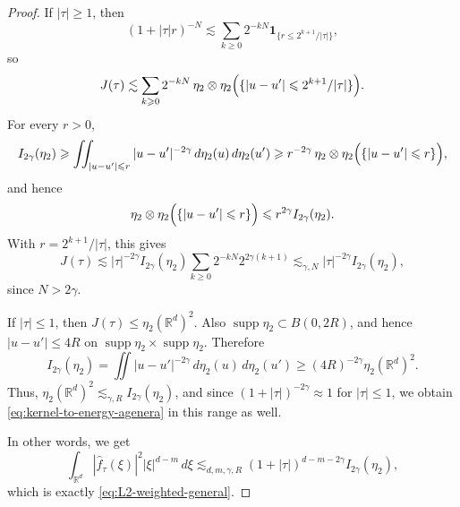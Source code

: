 \documentclass[10pt,a4paper]{amsart}
\newcommand{\Rd}{\mathbb{R}^d}
\newcommand{\spt}{\operatorname{supp}}
\renewcommand{\ge}{\geqslant}
\renewcommand{\le}{\leqslant}
\begin{document}
\begin{proof}
If $|\tau|\ge 1$, then
\[
(1+|\tau|r)^{-N}\lesssim \sum_{k\ge 0}2^{-kN}\mathbf 1_{\{r\le 2^{k+1}/|\tau|\}},
\]
so
\[
J(\tau)\lesssim
\sum_{k\ge 0}2^{-kN}\,
\eta_2\otimes\eta_2\Bigl(\{|u-u'|\le 2^{k+1}/|\tau|\}\Bigr).
\]
For every $r>0$,
\[
I_{2\gamma}(\eta_2)
\ge
\iint_{|u-u'|\le r}|u-u'|^{-2\gamma}\,d\eta_2(u)\,d\eta_2(u')
\ge
r^{-2\gamma}\,\eta_2\otimes\eta_2\Bigl(\{|u-u'|\le r\}\Bigr),
\]
and hence
\[
\eta_2\otimes\eta_2\Bigl(\{|u-u'|\le r\}\Bigr)
\le r^{2\gamma}I_{2\gamma}(\eta_2).
\]
With $r=2^{k+1}/|\tau|$, this gives
\[
J(\tau)\lesssim
|\tau|^{-2\gamma}I_{2\gamma}(\eta_2)
\sum_{k\ge 0}2^{-kN}2^{2\gamma(k+1)}
\lesssim_{\gamma,N}
|\tau|^{-2\gamma}I_{2\gamma}(\eta_2),
\]
since $N>2\gamma$.

If $|\tau|\le 1$, then $J(\tau)\le \eta_2(\Rd)^2$. Also
$\spt\eta_2\subset B(0,2R)$, and hence $|u-u'|\le 4R$ on
$\spt\eta_2\times\spt\eta_2$. Therefore
\[
I_{2\gamma}(\eta_2)
=
\iint |u-u'|^{-2\gamma}\,d\eta_2(u)\,d\eta_2(u')
\ge
(4R)^{-2\gamma}\eta_2(\Rd)^2.
\]
Thus, $\eta_2(\Rd)^2\lesssim_{\gamma,R} I_{2\gamma}(\eta_2)$, and since
$(1+|\tau|)^{-2\gamma}\approx 1$ for $|\tau|\le 1$, we obtain
\eqref{eq:kernel-to-energy-agenera} in this range as well.

In other words, we get
\[
\int_{\Rd}|\widehat f_{\tau}(\xi)|^2|\xi|^{d-m}\,d\xi
\lesssim_{d,m,\gamma,R}
(1+|\tau|)^{d-m-2\gamma}I_{2\gamma}(\eta_2),
\]
which is exactly \eqref{eq:L2-weighted-general}.
\end{proof}
\end{document}
